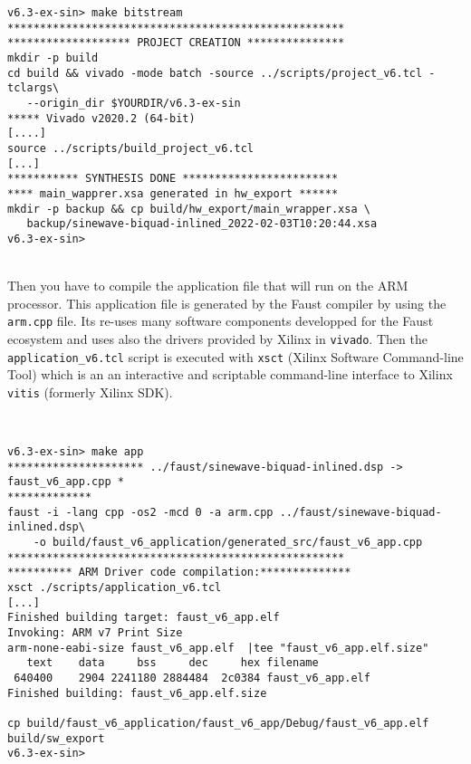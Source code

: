 \begin{boxedminipage}{\textwidth}
  \small
\begin{verbatim}
v6.3-ex-sin> make bitstream 
****************************************************
******************* PROJECT CREATION ***************
mkdir -p build
cd build && vivado -mode batch -source ../scripts/project_v6.tcl -tclargs\
   --origin_dir $YOURDIR/v6.3-ex-sin
***** Vivado v2020.2 (64-bit)
[....]
source ../scripts/build_project_v6.tcl
[...]
*********** SYNTHESIS DONE ************************
**** main_wapprer.xsa generated in hw_export ******
mkdir -p backup && cp build/hw_export/main_wrapper.xsa \
   backup/sinewave-biquad-inlined_2022-02-03T10:20:44.xsa
v6.3-ex-sin>
\end{verbatim}
\end{boxedminipage}
~\\

Then you have to compile the application file that will run on the ARM processor. This application file is generated by the Faust compiler by using the {\tt arm.cpp} file. Its re-uses many software components developped for the Faust ecosystem and uses also the drivers provided by Xilinx in {\tt vivado}. Then the {\tt application\_v6.tcl} script is executed with {\tt xsct} (Xilinx Software Command-line Tool) which is an an interactive and scriptable command-line interface to Xilinx {\tt vitis} (formerly Xilinx SDK).

~\\
\begin{boxedminipage}{1.01\textwidth}
  \small
\begin{verbatim}
v6.3-ex-sin> make app
********************* ../faust/sinewave-biquad-inlined.dsp -> faust_v6_app.cpp *
*************
faust -i -lang cpp -os2 -mcd 0 -a arm.cpp ../faust/sinewave-biquad-inlined.dsp\
    -o build/faust_v6_application/generated_src/faust_v6_app.cpp
****************************************************
********** ARM Driver code compilation:**************
xsct ./scripts/application_v6.tcl
[...]
Finished building target: faust_v6_app.elf
Invoking: ARM v7 Print Size
arm-none-eabi-size faust_v6_app.elf  |tee "faust_v6_app.elf.size"
   text	   data	    bss	    dec	    hex	filename
 640400	   2904	2241180	2884484	 2c0384	faust_v6_app.elf
Finished building: faust_v6_app.elf.size
 
cp build/faust_v6_application/faust_v6_app/Debug/faust_v6_app.elf build/sw_export
v6.3-ex-sin>
\end{verbatim}
\end{boxedminipage}
~\\

